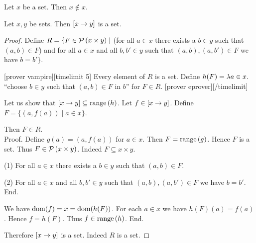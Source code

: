 \documentclass[../../set-theory/set-theory.tex]{subfiles}
\begin{document}
  \begin{forthel}
    \begin{corollary}
      Let $x$ be a set.
      Then $x \notin x$.
    \end{corollary}
  \end{forthel}

  \begin{forthel}
    \begin{proposition}
      Let $x, y$ be sets.
      Then $[x\to y]$ is a set.
    \end{proposition}
    \begin{proof}
      Define $R = \{ F \in \mathcal{P}\left(x \times y\right) \mid$ (for all $a \in x$ there
      exists a $b \in y$ such that $(a,b) \in F$) and for all $a \in x$ and
      all $b, b' \in y$ such that $(a,b), (a,b') \in F$ we have $b = b' \}$.

      [prover vampire][timelimit 5]
      Every element of $R$ is a set. %
      Define $h(F) = \mathrm{\lambda} a \in x.$ ``choose $b \in y$ such that
      $(a,b) \in F$ in $b$'' for $F \in R$.
      [prover eprover][/timelimit]

      Let us show that $[x\to y] \subseteq \mathrm{range}\left(h\right)$.
        Let $f \in [x\to y]$.
        Define $F = \{ (a,f(a)) \mid a \in x \}$.

        Then $F \in R$. \\
        Proof.
          Define $g(a) = (a,f(a))$ for $a \in x$.
          Then $F = \mathrm{range}\left(g\right)$.
          Hence $F$ is a set.
          Thus $F \in \mathcal{P}\left(x \times y\right)$.
          Indeed $F \subseteq x \times y$.

          (1) For all $a \in x$ there exists a $b \in y$ such that $(a,b) \in F$.

          (2) For all $a \in x$ and all $b, b' \in y$ such that $(a,b),
          (a,b') \in F$ we have $b = b'$.
        End.

        We have $\operatorname{dom}(f) = x = \operatorname{dom}(h(F))$.
        For each $a \in x$ we have $h(F)(a) = f(a)$.
        Hence $f = h(F)$.
        Thus $f \in \mathrm{range}\left(h\right)$.
      End.

      Therefore $[x\to y]$ is a set.
      Indeed $R$ is a set.
    \end{proof}
  \end{forthel}
\end{document}
